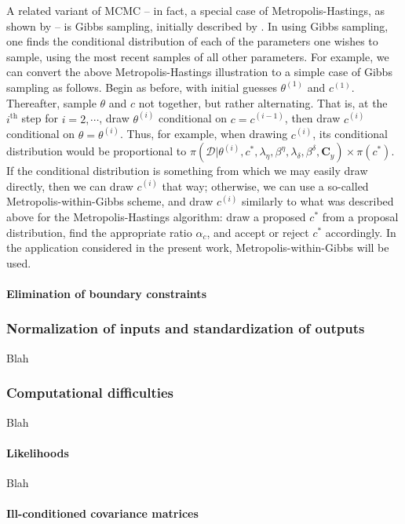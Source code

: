 \documentclass{article}
\begin{document}
A related variant of MCMC -- in fact, a special case of Metropolis-Hastings, as shown by \cite{Gelman1992} -- is Gibbs sampling, initially described by \cite{Geman1984}. In using Gibbs sampling, one finds the conditional distribution of each of the parameters one wishes to sample, using the most recent samples of all other parameters. For example, we can convert the above Metropolis-Hastings illustration to a simple case of Gibbs sampling as follows.
Begin as before, with initial guesses $\theta^{(1)}$ and $c^{(1)}$. Thereafter, sample $\theta$ and $c$ not together, but rather alternating. That is, at the $i^{\text{th} }$ step for $i=2,\cdots$, draw $\theta^{(i)}$ conditional on $c=c^{(i-1)}$, then draw $c^{(i)}$ conditional on $\theta=\theta^{(i)}$. Thus, for example, when drawing $c^{(i)}$, its conditional distribution would be proportional to $\pi(\mathcal D | \theta^{(i)},c^{*},\lambda_\eta, \beta^\eta,\lambda_\delta,\beta^\delta,\mathbf C_y) \times \pi(c^{*})$. 
If the conditional distribution is something from which we may easily draw directly, then we can draw $c^{(i)}$ that way; otherwise, we can use a so-called Metropolis-within-Gibbs scheme, and draw $c^{(i)}$ similarly to what was described above for the Metropolis-Hastings algorithm: draw a proposed $c^*$ from a proposal distribution, find the appropriate ratio $\alpha_c$, and accept or reject $c^*$ accordingly. In the application considered in the present work, Metropolis-within-Gibbs will be used.
\paragraph{Elimination of boundary constraints}

\subsubsection{Normalization of inputs and standardization of outputs}
Blah

\subsubsection{Computational difficulties}
Blah

\paragraph{Likelihoods}
Blah

\paragraph{Ill-conditioned covariance matrices}
\end{document}
